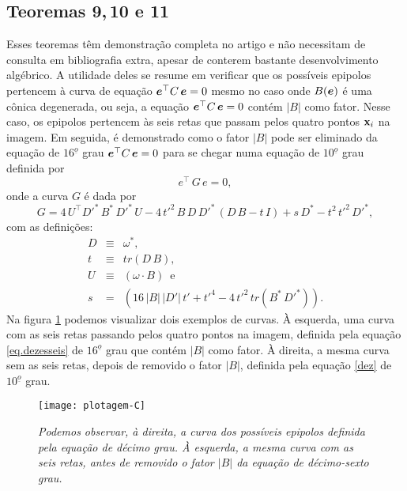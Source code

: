 \subsection{Teoremas 9,\,10 e 11}
Esses teoremas têm demonstração completa no artigo e não necessitam de consulta em bibliografia extra, apesar de conterem bastante desenvolvimento algébrico. A utilidade deles se resume em verificar que os possíveis epipolos pertencem à curva de equação $\boldsymbol{e}^\top C\,\boldsymbol{e}=0$ mesmo no caso onde $B(\boldsymbol{e})$ é uma cônica degenerada, ou seja, a equação $\boldsymbol{e}^\top C\,\boldsymbol{e}=0$ contém $|B|$ como fator.   Nesse caso, os epipolos pertencem às seis retas que passam pelos quatro pontos $\mathbf{x}_i$ na imagem. Em seguida, é demonstrado como o fator $|B|$ pode ser eliminado da equação de $16^{\underline{o}}$ grau $\boldsymbol{e}^\top C\,\boldsymbol{e}=0$ para se chegar numa equação de $10^{\underline{o}}$ grau definida por
\begin{equation}
e^\top\,G\,e=0,
\label{dez}
\end{equation}
onde a curva $G$ é dada por
\begin{equation}
G=4\,U^\top D'^*\,B^*\,D'^*\,U-4\,t'^2\,B\,D\,D'^*\,(D\,B-t\,I)+s\,D^*-t^2\,t'^2\,D'^*,
\label{conica-G}
\end{equation}
com as definições:
\begin{equation*}
\begin{array}{rcl}
D&\equiv&\omega^*,\\
t&\equiv&tr(D\,B),\\
U&\equiv&(\omega \cdot B)\,\,\, \text{e}\\
s&=&(16\,|B|\,|D'|\,t'+t'^4-4\,t'^2\,tr(B^*\,D'^*)).
\end{array}
\end{equation*}
Na figura \ref{plot-C} podemos visualizar dois exemplos de curvas. À esquerda, uma curva com as seis retas passando pelos quatro pontos na imagem, definida pela equação \ref{eq.dezesseis} de $16^{\underline{o}}$ grau que contém $|B|$ como fator. À direita, a mesma curva sem as seis retas, depois de removido o fator $|B|$, definida pela equação \ref{dez} de $10^{\underline{o}}$ grau.   

\begin{figure}[!htb]
\centering
\texttt{[image: plotagem-C]}
\caption{\textit{Podemos observar, à direita, a curva dos possíveis epipolos definida pela equação de décimo grau. À esquerda, a mesma curva com as seis retas, antes de removido o fator $|B|$ da equação de décimo-sexto grau.}}
\label{plot-C}
\end{figure}

